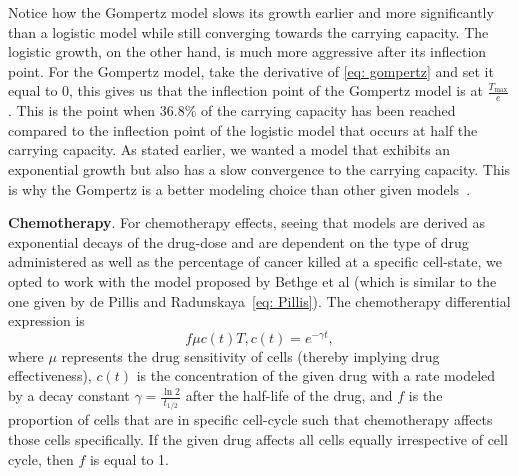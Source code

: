 \documentclass[11pt]{amsart}
\begin{document}
Notice how the Gompertz model slows its growth earlier %
and more significantly than a logistic model while still converging towards the carrying capacity.
The logistic growth, on the other hand, is much more aggressive after its inflection point.
For the Gompertz model, take the derivative of \eqref{eq: gompertz} and set it equal to 0, this gives us that  the inflection point of the Gompertz model is at $\frac{T_{\max}}{e}$.
This is the point when 36.8\% of the carrying capacity has been reached compared to the inflection point of the logistic model that occurs at half the carrying capacity.
As stated earlier, we wanted a model that exhibits an exponential growth but also has a slow convergence to the carrying capacity.
This is why the Gompertz is a better modeling choice than other given models\ \cite{LairdGompertz}. 

\textbf{Chemotherapy}. For chemotherapy effects, seeing that models are derived as exponential decays of the drug-dose and are dependent on the type of drug administered as well as the percentage of cancer killed at a specific cell-state, we opted to work with the model proposed by Bethge et al (which is similar to the one given by de Pillis and Radunskaya\ \eqref{eq: Pillis}). The chemotherapy differential expression is
\begin{equation}
	f \mu c(t) T, c(t) = e^{-\gamma t} \label{eq: chemo},
\end{equation}
where $\mu$ represents the drug sensitivity of cells (thereby implying drug effectiveness), $c(t)$ is the concentration of the given drug with a rate modeled by a decay constant $\gamma=\frac{\ln{2}}{t_{1/2}}$ after the half-life of the drug, and $f$ is %
the proportion of cells that are in specific cell-cycle such that chemotherapy affects those cells specifically.
If the given drug affects all cells equally irrespective of cell cycle, then $f$ is equal to 1.
\end{document}
